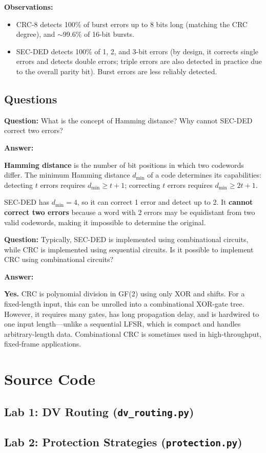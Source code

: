 \documentclass[12pt, letterpaper]{article}
\newcommand{\question}[1]{\noindent\textbf{Question: }#1\par\vspace{0.5em}}
\newcommand{\answer}{\noindent\textbf{Answer:}\par\vspace{0.5em}}
\begin{document}
\textbf{Observations:}
\begin{itemize}
    \item CRC-8 detects 100\% of burst errors up to 8 bits long (matching the CRC degree), and $\sim$99.6\% of 16-bit bursts.
    \item SEC-DED detects 100\% of 1, 2, and 3-bit errors (by design, it corrects single errors and detects double errors; triple errors are also detected in practice due to the overall parity bit). Burst errors are less reliably detected.
\end{itemize}

\subsection*{Questions}

\question{What is the concept of Hamming distance? Why cannot SEC-DED correct two errors?}

\answer
\textbf{Hamming distance} is the number of bit positions in which two codewords differ. The minimum Hamming distance $d_{\min}$ of a code determines its capabilities: detecting $t$ errors requires $d_{\min} \geq t+1$; correcting $t$ errors requires $d_{\min} \geq 2t+1$.

SEC-DED has $d_{\min} = 4$, so it can correct 1 error and detect up to 2. It \textbf{cannot correct two errors} because a word with 2 errors may be equidistant from two valid codewords, making it impossible to determine the original.

\question{Typically, SEC-DED is implemented using combinational circuits, while CRC is implemented using sequential circuits. Is it possible to implement CRC using combinational circuits?}

\answer
\textbf{Yes.} CRC is polynomial division in GF(2) using only XOR and shifts. For a fixed-length input, this can be unrolled into a combinational XOR-gate tree. However, it requires many gates, has long propagation delay, and is hardwired to one input length---unlike a sequential LFSR, which is compact and handles arbitrary-length data. Combinational CRC is sometimes used in high-throughput, fixed-frame applications.

\pagebreak
\section*{Source Code}

\subsection*{Lab 1: DV Routing (\texttt{dv\_routing.py})}


\pagebreak
\subsection*{Lab 2: Protection Strategies (\texttt{protection.py})}

\end{document}

